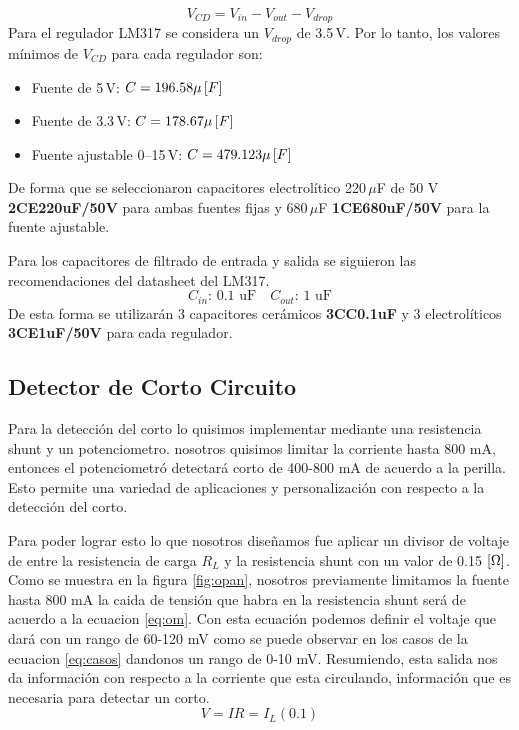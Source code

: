 \documentclass[pdflatex,sn-mathphys-num]{sn-jnl}%
\begin{document}
\begin{equation}
    V_{CD} = V_{in} - V_{out} - V_{drop}
    \label{eq:vcd}
\end{equation}
Para el regulador LM317 se considera un $V_{drop}$ de 3.5\,V. Por lo tanto, los valores mínimos de $V_{CD}$ para cada regulador son:
\begin{itemize}
    \item Fuente de 5\,V: $C = 196.58 \mu \left[F\right]$
    \item Fuente de 3.3\,V: $C = 178.67 \mu \left[F\right]$
    \item Fuente ajustable 0--15\,V: $C = 479.123 \mu \left[F\right]$
\end{itemize}
De forma que se seleccionaron capacitores electrolítico 220\,$\mu$F de 50 V \textbf{2CE220uF/50V} para ambas fuentes fijas y 680\,$\mu$F \textbf{1CE680uF/50V} para la fuente ajustable.

Para los capacitores de filtrado de entrada y salida se siguieron las recomendaciones del datasheet del LM317.
$$
C_{in}\text{: 0.1 uF} \quad C_{out}\text{: 1 uF}
$$
De esta forma se utilizarán 3 capacitores cerámicos \textbf{3CC0.1uF} y 3 electrolíticos \textbf{3CE1uF/50V} para cada regulador.


\subsection{Detector de Corto Circuito}
Para la detección del corto lo quisimos implementar mediante una resistencia shunt y un potenciometro. nosotros quisimos limitar la corriente hasta 800 mA, entonces el potenciometró detectará corto de 400-800 mA de acuerdo a la perilla. Esto permite una variedad de aplicaciones y personalización con respecto a la detección del corto.



Para poder lograr esto lo que nosotros diseñamos fue aplicar un divisor de voltaje de entre la resistencia de carga $R_L$ y la resistencia shunt con un valor de 0.15 $\left[\Omega\right]$. Como se muestra en la figura \ref{fig:opan}, nosotros previamente limitamos la fuente hasta 800 mA la caida de tensión que habra en la resistencia shunt será de acuerdo a la ecuacion \ref{eq:om}. Con esta ecuación podemos definir el voltaje que dará con un rango de 60-120 mV como se puede observar en los casos de la ecuacion \ref{eq:casos} dandonos un rango de 0-10 mV. Resumiendo, esta salida nos da información con respecto a la corriente que esta circulando, información que es necesaria para detectar un corto.
\begin{equation}
    V= IR= I_L (0.1)
    \label{eq:om}
\end{equation}
\end{document}
